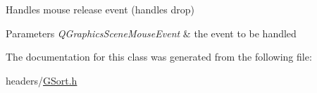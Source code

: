 \-Handles mouse release event (handles drop) 


\begin{DoxyParams}{\-Parameters}
{\em \-Q\-Graphics\-Scene\-Mouse\-Event} & the event to be handled \\
\hline
\end{DoxyParams}


\-The documentation for this class was generated from the following file\-:\begin{DoxyCompactItemize}
\item 
headers/\hyperlink{_g_sort_8h}{\-G\-Sort.\-h}\end{DoxyCompactItemize}
